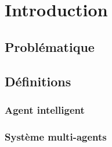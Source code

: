 \chapter{Introduction}
\section{Problématique}
\section{Définitions}
\subsection{Agent intelligent}
\subsection{Système multi-agents}

